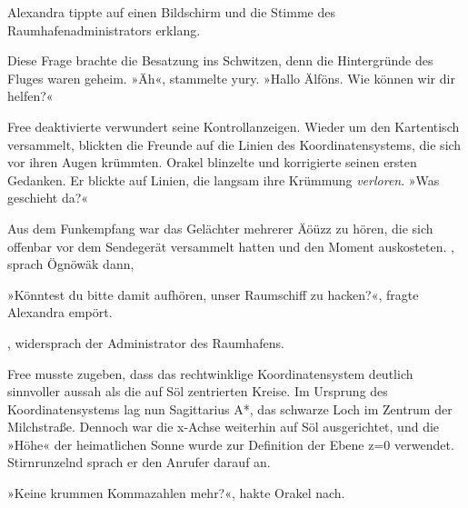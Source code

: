 Alexandra tippte auf einen Bildschirm und die Stimme des Raumhafenadministrators erklang. 

Diese Frage brachte die Besatzung ins Schwitzen, denn die Hintergründe des Fluges waren geheim. »Äh«, stammelte yury. »Hallo Älföns. Wie können wir dir helfen?«


Free deaktivierte verwundert seine Kontrollanzeigen. Wieder um den Kartentisch versammelt, blickten die Freunde auf die Linien des Koordinatensystems, die sich vor ihren Augen krümmten. Orakel blinzelte und korrigierte seinen ersten Gedanken. Er blickte auf Linien, die langsam ihre Krümmung \emph{verloren}. »Was geschieht da?«

Aus dem Funkempfang war das Gelächter mehrerer Äöüzz zu hören, die sich offenbar vor dem Sendegerät versammelt hatten und den Moment auskosteten. , sprach Ögnöwäk dann, 

»Könntest du bitte damit aufhören, unser Raumschiff zu hacken?«, fragte Alexandra empört.

, widersprach der Administrator des Raumhafens. 

Free musste zugeben, dass das rechtwinklige Koordinatensystem deutlich sinnvoller aussah als die auf Söl zentrierten Kreise. Im Ursprung des Koordinatensystems lag nun Sagittarius A*, das schwarze Loch im Zentrum der Milchstraße. Dennoch war die x-Achse weiterhin auf Söl ausgerichtet, und die »Höhe« der heimatlichen Sonne wurde zur Definition der Ebene z=0 verwendet. Stirnrunzelnd sprach er den Anrufer darauf an.


»Keine krummen Kommazahlen mehr?«, hakte Orakel nach.


